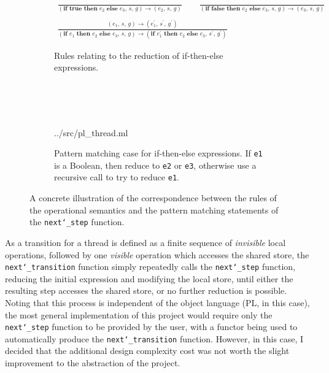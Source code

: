 \documentclass[12pt,a4paper,twoside,openright]{report}
\begin{document}
\begin{figure}
	\begin{subfigure}{\textwidth}
		\begin{gather*}
		\frac{}
		{(\textbf{if true then } e_2 \textbf{ else }
				e_3,\,s,\,g) \rightarrow (e_2,\,s,\,g)}
		\qquad
		\frac{}
		{(\textbf{if false then } e_2 \textbf{ else }
			e_3,\,s,\,g) \rightarrow (e_3,\,s,\,g)} \\
		\\
		\frac{(e_1,\,s,\,g) \rightarrow
			(e_1^{\prime},\,s^{\prime},\,g^{\prime})}
		{(\textbf{if } e_1 \textbf{ then }
			e_2 \textbf{ else } e_3,\,s,\,g)
			\rightarrow (\textbf{if } e_1^{\prime}
			 \textbf{ then }
			e_2 \textbf{ else } e_3,\,
			s^{\prime},\,g^{\prime})}
		\end{gather*}
		\caption{Rules relating to
			the reduction of if-then-else expressions.}
	\end{subfigure}
	\\ \\ \\
	\begin{subfigure}{\textwidth}
		
			{../src/pl_thread.ml}
		\caption{Pattern matching case for if-then-else expressions.
			If \texttt{e1} is a Boolean, then reduce to \texttt{e2} or
			\texttt{e3},
			otherwise use a recursive call to try to reduce \texttt{e1}.}
	\end{subfigure}
	\caption{A concrete illustration of the correspondence
		between the rules of the operational semantics
		and the pattern matching statements of the
		\texttt{next\char`_step} function.}
	\label{fig:step-rule-correspondence}
\end{figure}

As a transition for a thread is defined as a
finite sequence of \emph{invisible} local
operations, followed by one \emph{visible} operation
which accesses the shared store, the \texttt{next\char`_transition}
function simply repeatedly calls the \texttt{next\char`_step}
function, reducing the initial expression and modifying
the local store, until either the resulting step accesses the shared
store, or no further reduction is possible. Noting that this
process is independent of the object language (PL, in this case),
the most general implementation of this project would require
only the  \texttt{next\char`_step} function to be provided by
the user, with a functor being used to automatically
produce the \texttt{next\char`_transition} function. However,
in this case, I decided that the additional design complexity
cost was not worth the slight improvement to the abstraction
of the project.
\end{document}

